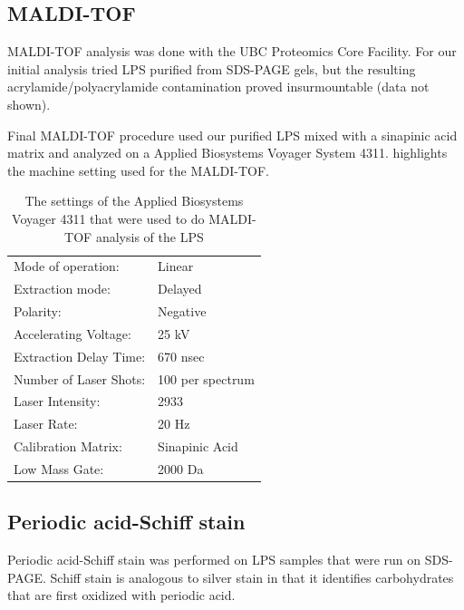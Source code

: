     \subsection{\Acl{MALDI-TOF}}\label{sec:acmaldi-tof}
     
    \ac{MALDI-TOF} analysis was done with the UBC Proteomics Core Facility. For our initial analysis  tried \ac{LPS} purified from \ac{SDS-PAGE} gels, but the resulting acrylamide/polyacrylamide contamination proved insurmountable (data not shown). 

    Final \ac{MALDI-TOF} procedure used our purified \ac{LPS} mixed with a sinapinic acid matrix and analyzed on a Applied Biosystems Voyager System 4311.  highlights the machine setting used for the \ac{MALDI-TOF}.
     
    \begin{table}[htb]
      \centering
      \caption[\ac{MALDI-TOF} settings]{The settings of the Applied Biosystems Voyager 4311 that were used to do \ac{MALDI-TOF} analysis of the \caulobacter{} \ac{LPS}}
      \label{tab:mssettings}
      \begin{tabular}{ll}
        \toprule
        Mode of operation:     & Linear           \\
        Extraction mode:       & Delayed          \\
        Polarity:              & Negative         \\
        Accelerating Voltage:  & 25 kV            \\
        Extraction Delay Time: & 670 nsec         \\
        Number of Laser Shots: & 100 per spectrum \\
        Laser Intensity:       & 2933             \\
        Laser Rate:            & 20 Hz            \\
        Calibration Matrix:    & Sinapinic Acid    \\
        Low Mass Gate:         & 2000 Da      \\   \bottomrule
      \end{tabular}
    \end{table}

    \subsection{Periodic acid-Schiff stain} %
    \label{sub:schiff_stain}
		
    Periodic   acid-Schiff   stain   was   performed   on  \ac{LPS}   samples   that   were   run   on
    \ac{SDS-PAGE}. Schiff stain is analogous to silver  stain in that it identifies carbohydrates that
    are first oxidized with periodic acid.

